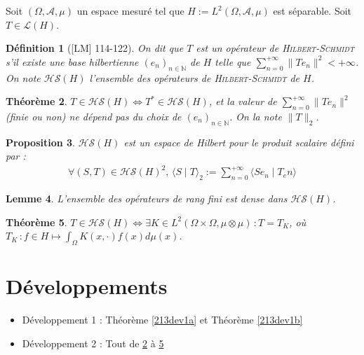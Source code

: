 \documentclass[10pt, a4paper, parskip=full, twoside, twocolumn]{report}
\newtheorem{definition}{Définition}
\newtheorem{theorem}[definition]{Théorème}
\newtheorem{proposition}[definition]{Proposition}
\newtheorem{lemma}[definition]{Lemme}
\newcommand{\IN}{\mathbb{N}}
\newcommand{\A}{\mathscr{A}}
\newcommand{\ps}[2]{\langle #1\mid #2\rangle}
\begin{document}
\textcolor{paragraphtext}{Soit $(\Omega, \A,\mu)$ un espace mesuré tel que $H := L^2(\Omega, \A, \mu)$ est séparable. Soit $T\in \mathcal{L}(H)$.}

\begin{definition}[\textnormal{[LM] 114-122}]
	On dit que $T$ est un \emph{opérateur de \textsc{Hilbert-Schmidt}} s'il existe une base hilbertienne $\left(e_n\right)_{n\in\IN}$ de $H$ telle que $\sum_{n=0}^{+\infty} \|Te_n\|^2 < +\infty$.
	On note $\mathcal{HS}(H)$ l'ensemble des opérateurs de \textsc{Hilbert-Schmidt} de $H$.
\end{definition}

\begin{tcolorbox}[
    breakable, %
    colback=developpement, %
    colframe=gray!0!black, %
    boxrule=0pt, %
    arc=1mm, %
	boxsep=0pt,
	left=0pt, right=0pt, top=0pt, bottom=0pt
]
\begin{theorem}
	\label{213dev21}
	$T \in\mathcal{HS}(H) \iff T^*\in \mathcal{HS}(H)$, et la valeur de $\sum_{n=0}^{+\infty} \|Te_n\|^2$ (finie ou non) ne dépend pas du choix de $\left(e_n\right)_{n\in\IN}$. On la note $\|T\|_2$.
\end{theorem}

\begin{proposition}
	\label{213dev22}
	$\mathcal{HS}(H)$ est un espace de Hilbert pour le produit scalaire défini par :
	\begin{align*}
		\forall (S,T)\in \mathcal{HS}(H)^2,\, \ps{S}{T}_2 := \sum_{n=0}^{+\infty} \ps{Se_n}{T_en}
	\end{align*}
\end{proposition}

\begin{lemma}
	\label{213dev23}
	L'ensemble des opérateurs de rang fini est dense dans $\mathcal{HS}(H)$.
\end{lemma}

\begin{theorem}
	\label{213dev24}
	$T\in\mathcal{HS}(H)\iff \exists K\in L^2(\Omega\times\Omega, \mu\otimes\mu)\,\colon T=T_K$, 
	où $T_K\,\colon f\in H \mapsto \int_{\Omega} K(x,\cdot)f(x)d\mu(x)$.
\end{theorem}
\end{tcolorbox}

\section*{Développements}
\begin{itemize}
	\item Développement 1 : Théorème \ref{213dev1a} et Théorème \ref{213dev1b}
	\item Développement 2 : Tout de \ref{213dev21} à \ref{213dev24}
\end{itemize}
\end{document}
